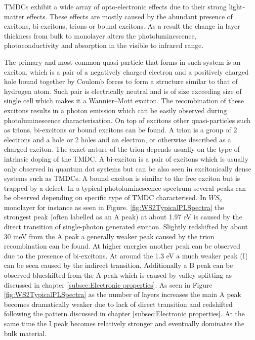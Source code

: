 	TMDCs exhibit a wide array of opto-electronic effects due to their strong light-matter effects. These effects are mostly caused by the abundant presence of excitons, bi-excitons, trions or bound excitons. As a result the change in layer thickness from bulk to monolayer alters the photoluminescence, photoconductivity and absorption in the visible to infrared range.
		
	The primary and most common quasi-particle that forms in such system is an exciton, which is a pair of a negatively charged electron and a positively charged hole bound together by Coulomb forces to form a structure similar to that of hydrogen atom. Such pair is electrically neutral and is of size exceeding size of single cell which makes it a Wannier–Mott exciton. The recombination of these excitons results in a photon emission which can be easily observed during photoluminescence characterisation. On top of excitons other quasi-particles such as trions, bi-excitons or bound excitons can be found. A trion is a group of 2 electrons and a hole or 2 holes and an electron, or otherwise described as a charged exciton. The exact nature of the trion depends usually on the type of intrinsic doping of the TMDC. A bi-exciton is a pair of excitons which is usually only observed in quantum dot systems but can be also seen in excitonically dense systems such as TMDCs. A bound exciton is similar to the free exciton but is trapped by a defect. In a typical photoluminescence spectrum several peaks can be observed depending on specific type of TMDC characterised. In $WS_2$ monolayer for instance as seen in Figure. \ref{fig:WS2TypicalPLSpectra} the strongest peak (often labelled as an A peak) at about 1.97 eV is caused by the direct transition of single-photon generated exciton. Slightly redshifted by about 30 meV from the A peak a generally weaker peak caused by the trion recombination can be found. At higher energies another peak can be observed due to the presence of bi-excitons. At around the 1.3 eV a much weaker peak (I) can be seen caused by the indirect transition. Additionally a B peak can be observed blueshifted from the A peak which is caused by valley splitting as discussed in chapter \ref{subsec:Electronic properties}. As seen in Figure \ref{fig:WS2TypicalPLSpectra} as the number of layers increases the main A peak becomes dramatically weaker due to lack of direct transition and redshifted following the pattern discussed in chapter \ref{subsec:Electronic properties}. At the same time the I peak becomes relatively stronger and eventually dominates the bulk material.
		
